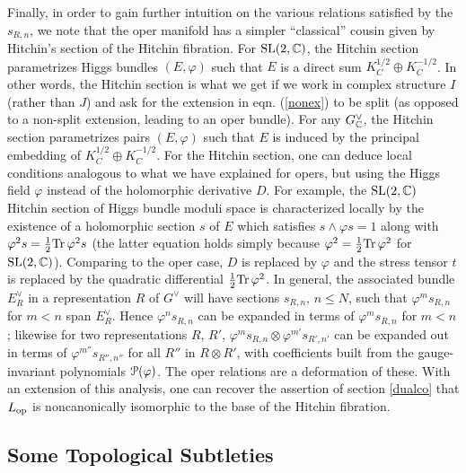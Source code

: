 \documentclass[11pt,a4paper]{article}
\begin{document}
Finally, in order to gain further intuition on the various relations satisfied by the $s_{R,n}$, we 
note that the oper manifold has a simpler ``classical'' cousin given by Hitchin's section of the Hitchin fibration.   
For $\SL(2,\C)$, the Hitchin section parametrizes Higgs bundles $(E,\varphi)$ such that $E$ is a direct sum $K_C^{1/2} \oplus K_C^{-1/2}$.
In other words, the Hitchin section is what we get if we work in complex structure $I$ (rather than $J$) and ask for the extension in eqn. (\ref{nonex}) to be split
(as opposed to a non-split extension, leading to an oper bundle).  For any $G^\vee_\C$, the Hitchin section parametrizes pairs $(E,\varphi)$ such that $E$ 
is induced by the principal embedding of $K_C^{1/2} \oplus K_C^{-1/2}$.
  For the Hitchin section, one can deduce local conditions analogous to what we have explained
for opers, but using the 
 Higgs field $\varphi$ instead of the holomorphic derivative $D$. 
For example, the $\SL(2,\C)$ Hitchin section of Higgs bundle moduli space  is characterized locally by the existence of a holomorphic section $s$  of $E$
which satisfies $s \wedge \varphi s=1$ along with  $\varphi^2 s = \frac12 \Tr\, \varphi^2 s$  (the latter equation holds simply because $\varphi^2=\frac12 \Tr\, \varphi^2$
for $\SL(2,\C)$). 
Comparing to the oper case, $D$ is replaced by $\varphi$ and the stress tensor $t$ is replaced by the quadratic differential
$\frac12\Tr\,\varphi^2$.
In general, the associated bundle $E^\vee_R$ 
in a representation $R$ of $G^\vee$ will have sections $s_{R,n}$, $n\leq N$, such that $\varphi^m s_{R,n}$ for $m<n$ 
span $E^\vee_{R}$. Hence $\varphi^n s_{R,n}$ can be expanded in terms of $\varphi^m s_{R,n}$ for $m<n$; likewise
for two representations $R$, $R'$,  $\varphi^m s_{R,n} \otimes \varphi^{m'} s_{R',n'}$ 
can be expanded out in terms of $\varphi^{m''} s_{R'',n''}$ for all $R''$ in $R \otimes R'$, with coefficients built from the 
gauge-invariant polynomials $\P(\varphi)$. The oper relations are a deformation of these.   With an extension of this analysis, one can recover the assertion of section 
\ref{dualco} that $L_\op$ is noncanonically isomorphic to the base of the Hitchin fibration.

\subsection{Some Topological Subtleties}\label{toposubt}
\end{document}

